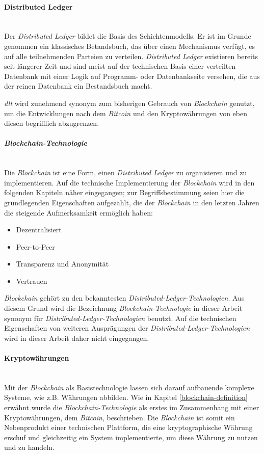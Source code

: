 \paragraph{Distributed Ledger}$~~$\\
Der \textit{Distributed Ledger} bildet die Basis des Schichtenmodells. Er ist im Grunde genommen ein klassisches Betandsbuch, das über einen Mechanismus verfügt, es auf alle teilnehmenden Parteien zu verteilen. \textit{Distributed Ledger} existieren bereits seit längerer Zeit und sind meist auf der technischen Basis einer verteilten Datenbank mit einer Logik auf Programm- oder Datenbankseite versehen, die aus der reinen Datenbank ein Bestandsbuch macht.

\textit{\acf{dlt}} wird zunehmend synonym zum bisherigen Gebrauch von \textit{Blockchain} genutzt, um die Entwicklungen nach dem \textit{Bitcoin} und den Kryptowährungen von eben diesen begrifflich abzugrenzen.

\paragraph{\textit{Blockchain-Technologie}}$~~$\\
Die \textit{Blockchain} ist eine Form, einen \textit{Distributed Ledger} zu organisieren und zu implementieren. Auf die technische Implementierung der \textit{Blockchain} wird in den folgenden Kapiteln näher eingegangen; zur Begriffsbestimmung seien hier die grundlegenden Eigenschaften aufgezählt, die der \textit{Blockchain} in den letzten Jahren die steigende Aufmerksamkeit ermöglich haben:

\begin{itemize}
  \item Dezentralisiert
  \item Peer-to-Peer
  \item Transparenz und Anonymität
  \item Vertrauen
\end{itemize}

\textit{Blockchain} gehört zu den bekanntesten \textit{Distributed-Ledger-Technologien}. Aus diesem Grund wird die Bezeichnung \textit{Blockchain-Technologie} in dieser Arbeit synonym für \textit{Distributed-Ledger-Technologien} benutzt. Auf die technischen Eigenschaften von weiteren Ausprägungen der \textit{Distributed-Ledger-Technologien} wird in dieser Arbeit daher nicht eingegangen.

\paragraph{Kryptowährungen}$~~$\\
Mit der \textit{Blockchain} als Basistechnologie lassen sich darauf aufbauende komplexe Systeme, wie z.B. Währungen abbilden. Wie in Kapitel \ref{blockchain-definition} erwähnt wurde die \textit{Blockchain-Technologie} als erstes im Zusammenhang mit einer Kryptowährungen, dem \textit{Bitcoin}, beschrieben. Die \textit{Blockchain} ist somit ein Nebenprodukt einer technischen Plattform, die eine kryptographische Währung erschuf und gleichzeitig ein System implementierte, um diese Währung zu nutzen und zu handeln.

